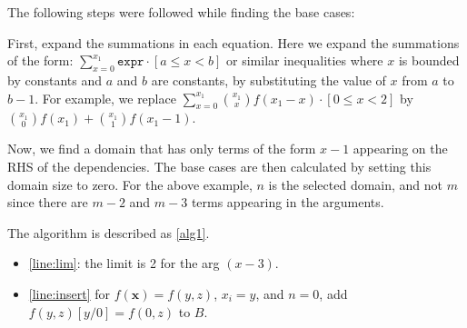\documentclass{article}
\newcommand{\expr}{\mathtt{expr}}
\begin{document}

The following steps were followed while finding the base cases:

First, expand the summations in each equation. Here we expand the summations of
the form: $\sum_{x=0}^{x_{1}} \expr{} \cdot [a \le x < b]$ or similar
inequalities where $x$ is bounded by constants and $a$ and $b$ are constants, by
substituting the value of $x$ from $a$ to $b-1$. For example, we replace
$\sum_{x=0}^{x_1} \binom{x_{1}}{x} f(x_1 - x) \cdot [0 \le x < 2]$ by
$\binom{x_{1}}{0} f(x_1) + \binom{x_{1}}{1} f(x_1-1)$.

Now, we find a domain that has only terms of the form $x-1$ appearing on the RHS
of the dependencies. The base cases are then calculated by setting this domain
size to zero. For the above example, $n$ is the selected domain, and not $m$
since there are $m-2$ and $m-3$ terms appearing in the arguments.

The algorithm is described as \cref{alg1}.


\begin{itemize}
  \item \cref{line:lim}: the limit is 2 for the arg $(x-3)$.
  \item \cref{line:insert} for $f(\mathbf{x}) = f(y, z)$, $x_{i} = y$, and
        $n = 0$, add $f(y, z)[y/0] = f(0, z)$ to $B$.
\end{itemize}

\end{document}
